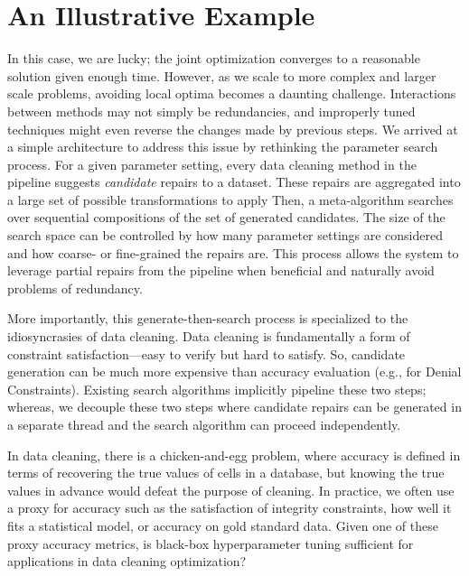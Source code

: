 \section{An Illustrative Example}


In this case, we are lucky; the joint optimization converges to a reasonable solution given enough time.  However, as we scale to more complex and larger scale problems, avoiding local optima becomes a daunting challenge.  Interactions between methods may not simply be redundancies, and improperly tuned techniques might even reverse the changes made by previous steps.  We arrived at a simple architecture to address this issue by rethinking the parameter search process.  For a given parameter setting, every data cleaning method in the pipeline suggests \emph{candidate} repairs to a dataset.  These repairs are aggregated into a large set of possible transformations to apply Then, a meta-algorithm searches over sequential compositions of the set of generated candidates.  The size of the search space can be controlled by how many parameter settings are considered and how coarse- or fine-grained the repairs are.  This process allows the system to leverage partial repairs from the pipeline when beneficial and naturally avoid problems of redundancy.


More importantly, this generate-then-search process is specialized to the idiosyncrasies of data cleaning.  Data cleaning is fundamentally a form of constraint satisfaction---easy to verify but hard to satisfy.  So, candidate generation can be much more expensive than accuracy evaluation (e.g., for Denial Constraints).  Existing search algorithms implicitly pipeline these two steps; whereas, we decouple these two steps where candidate repairs can be generated in a separate thread and the search algorithm can proceed independently.


In data cleaning, there is a chicken-and-egg problem, where accuracy is defined in terms of recovering the true values of cells in a database, but knowing the true values in advance would defeat the purpose of cleaning.  In practice, we often use a proxy for accuracy such as the satisfaction of integrity constraints, how well it fits a statistical model, or accuracy on gold standard data.  Given one of these proxy accuracy metrics, is black-box hyperparameter tuning sufficient for applications in data cleaning optimization?



